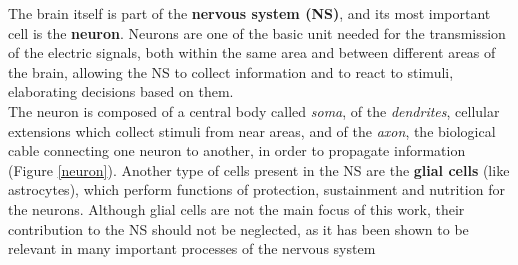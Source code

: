 \documentclass[12pt, a4paper]{report}
\begin{document}
	
	The brain itself is part of the \textbf{nervous system (NS)}, and its most important cell is the \textbf{neuron}.	Neurons are one of the basic unit needed for the transmission of
	the electric signals, both within the same area and between different areas of
	the brain, allowing the NS to collect information and to react to stimuli,
	elaborating decisions based on them. \\
	The neuron is composed of a central body called \textit{soma}, of the \textit{dendrites}, cellular extensions which collect stimuli from near areas, and of the \textit{axon}, the biological cable connecting one neuron to another, in order to propagate information (Figure \ref{neuron}). 
	Another type of cells present in the NS are the \textbf{glial cells} (like astrocytes), which perform functions of protection, sustainment and nutrition for the neurons. Although glial cells are not the main focus of this work, their contribution to the NS should not be neglected, as it has been shown to be relevant in many important processes of the nervous system \cite{1} %
	
		
	
\end{document}
